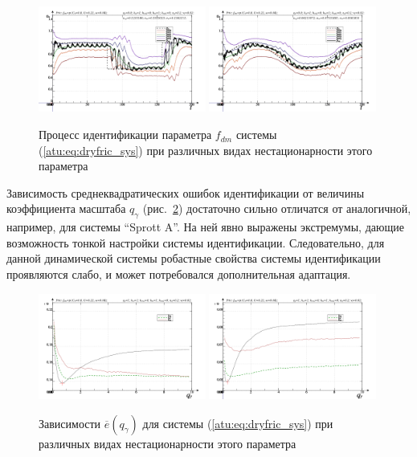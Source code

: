 \begin{figure}[htb!]
\centerline{
  \includegraphics[width=0.49\textwidth]{p/cha/fric/fric_m5p-pl_n_sign.png}
  \includegraphics[width=0.49\textwidth]{p/cha/fric/fric_m5p-pl_n_sin.png}
}
\caption{Процесс идентификации параметра $f_{dm} $ системы (\ref{atu:eq:dryfric_sys})
  при различных видах нестационарности этого параметра
}
\label{atu:f:fric_id}
\end{figure}

Зависимость среднеквадратических ошибок идентификации от величины коэффициента масштаба
$q_\gamma$ (рис.~\ref{atu:f:fric_e_qgamma})
достаточно сильно отличатся от аналогичной, например, для системы ``Sprott A''. На ней явно выражены
экстремумы, дающие возможность тонкой настройки системы идентификации. Следовательно,
для данной динамической системы робастные свойства системы идентификации проявляются слабо,
и может потребовался дополнительная адаптация.

\begin{figure}[htb!]
\centerline{
  \includegraphics[width=0.49\textwidth]{p/cha/fric/fric_m5p-p_qg_e_sign.png}
  \includegraphics[width=0.49\textwidth]{p/cha/fric/fric_m5p-p_qg_e_sin.png}
}
  \caption{Зависимости  $\overline{e}(q_\gamma)$ для системы (\ref{atu:eq:dryfric_sys})
  при различных видах нестационарности этого параметра
}
\label{atu:f:fric_e_qgamma}
\end{figure}


